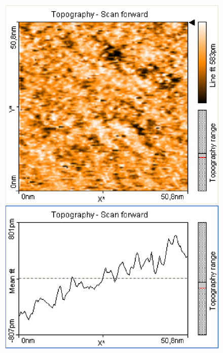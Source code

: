 \documentclass[12pt]{article}
\begin{document}
\begin{figure}[H]
\begin{minipage}{0.4\linewidth}
\includegraphics[width=0.9\linewidth]{../plot/data/mos2/mos23.eps}
\end{minipage}
\end{figure}
\end{document}
